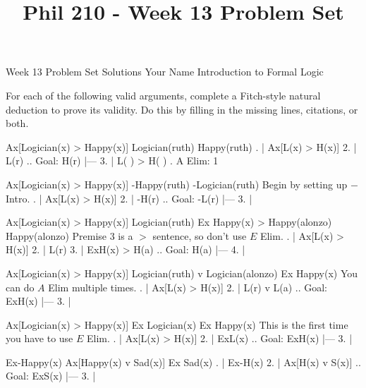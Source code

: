 
\title{Phil 210 - Week 13 Problem Set}

\heading
Week 13 Problem Set Solutions
Your Name
Introduction to Formal Logic
\endheading

For each of the following valid arguments, complete a Fitch-style natural deduction to prove its validity. Do this by filling in the missing lines, citations, or both.

\quantifiers
\problems
{}
\argument
 Ax[Logician(x) > Happy(x)]
 Logician(ruth) 
\argumentline
 Happy(ruth) 
\endargument
	\answer
	. | Ax[L(x) > H(x)]
	 2. | L(r)             ..  Goal: H(r)
	    |---
	 3. | L( ) > H( )      .  A Elim: 1
	\endfitchproof
	\endanswer

\argument
 Ax[Logician(x) > Happy(x)]
 -Happy(ruth) 
\argumentline
 -Logician(ruth) 
\endargument
\Hint Begin by setting up $-$ Intro.
	\answer
	. | Ax[L(x) > H(x)]
	 2. | -H(r)             ..  Goal: -L(r)
	    |---
	 3. | 
	\endfitchproof
	\endanswer

\argument
 Ax[Logician(x) > Happy(x)]
 Logician(ruth)
 Ex Happy(x) > Happy(alonzo)
\argumentline
 Happy(alonzo) 
\endargument
\Hint Premise 3 is a $>$ sentence, so don't use $E$ Elim.
	\answer
	. | Ax[L(x) > H(x)]
	 2. | L(r)
	 3. | ExH(x) > H(a)    ..  Goal: H(a)
	    |---
	 4. |
	\endfitchproof
	\endanswer

\argument
 Ax[Logician(x) > Happy(x)]
 Logician(ruth) v Logician(alonzo)
\argumentline
 Ex Happy(x)
\endargument
\Hint You can do $A$ Elim multiple times.
	\answer
	. | Ax[L(x) > H(x)]
	 2. | L(r) v L(a)      ..  Goal: ExH(x)
	    |---
	 3. | 
	\endfitchproof
	\endanswer

\argument
 Ax[Logician(x) > Happy(x)]
 Ex Logician(x)
\argumentline
 Ex Happy(x)
\endargument
\Hint This is the first time you have to use $E$ Elim.
	\answer
	. | Ax[L(x) > H(x)]
	 2. | ExL(x)           ..  Goal: ExH(x)
	    |---
	 3. | 
	\endfitchproof
	\endanswer

\argument
 Ex-Happy(x)
 Ax[Happy(x) v Sad(x)]
\argumentline
 Ex Sad(x)
\endargument
	\answer
	. | Ex-H(x)
	 2. | Ax[H(x) v S(x)]  ..  Goal: ExS(x)
	    |---
	 3. | 
	\endfitchproof
	\endanswer

\endproblems
\bye
